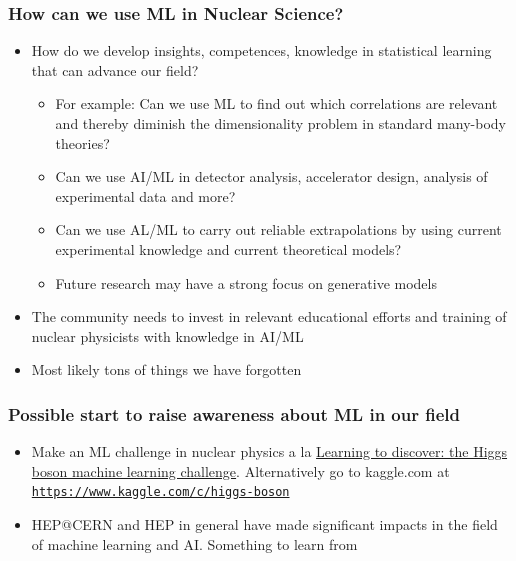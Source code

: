 \documentclass{beamer}
\begin{document}
\begin{frame}
\frametitle{How can we use ML in Nuclear Science?}

\begin{block}{}
\begin{itemize}
\item How do we develop insights, competences, knowledge in statistical learning that can advance our field?
\begin{itemize}

  \item For example: Can we use ML to find out which correlations are relevant and thereby diminish the dimensionality problem in standard many-body  theories?

  \item Can we use AI/ML in detector analysis, accelerator design, analysis of experimental data and more?

  \item Can we use AL/ML to carry out reliable extrapolations by using current experimental knowledge and current theoretical models?

  \item Future research may have a strong focus on generative models

\end{itemize}

\noindent
\item The community needs to invest in relevant educational efforts and training of nuclear physicists with knowledge in AI/ML

\item Most likely tons of things we have forgotten
\end{itemize}

\noindent
\end{block}
\end{frame}

\begin{frame}
\frametitle{Possible start to raise awareness about ML in our field}

\begin{block}{}
\begin{itemize}
\item Make an ML challenge in nuclear physics a la \href{{https://home.cern/news/news/computing/higgs-boson-machine-learning-challenge}}{Learning to discover: the Higgs boson machine learning challenge}. Alternatively go to kaggle.com at \href{{https://www.kaggle.com/c/higgs-boson}}{\nolinkurl{https://www.kaggle.com/c/higgs-boson}}

\item HEP@CERN and HEP in general have made significant impacts in the field of machine learning and AI. Something to learn from
\end{itemize}

\noindent
\end{block}
\end{frame}
\end{document}
